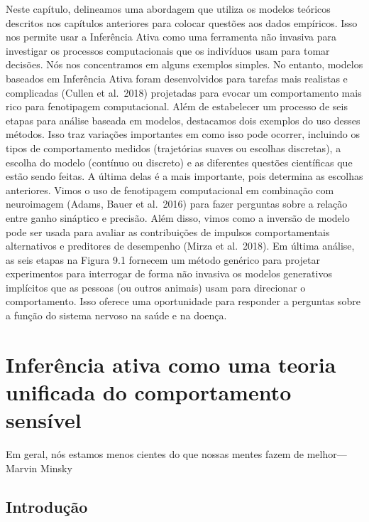 \documentclass[
  12pt,
]{book}
\begin{document}
Neste capítulo, delineamos uma abordagem que utiliza os modelos teóricos descritos nos capítulos anteriores para colocar questões aos dados empíricos. Isso nos permite usar a Inferência Ativa como uma ferramenta não invasiva para investigar os processos computacionais que os indivíduos usam para tomar decisões. Nós nos concentramos em alguns exemplos simples. No entanto, modelos baseados em Inferência Ativa foram desenvolvidos para tarefas mais realistas e complicadas (Cullen et al.~2018) projetadas para evocar um comportamento mais rico para fenotipagem computacional. Além de estabelecer um processo de seis etapas para análise baseada em modelos, destacamos dois exemplos do uso desses métodos. Isso traz variações importantes em como isso pode ocorrer, incluindo os tipos de comportamento medidos (trajetórias suaves ou escolhas discretas), a escolha do modelo (contínuo ou discreto) e as diferentes questões científicas que estão sendo feitas. A última delas é a mais importante, pois determina as escolhas anteriores. Vimos o uso de fenotipagem computacional em combinação com neuroimagem (Adams, Bauer et al.~2016) para fazer perguntas sobre a relação entre ganho sináptico e precisão. Além disso, vimos como a inversão de modelo pode ser usada para avaliar as contribuições de impulsos comportamentais alternativos e preditores de desempenho (Mirza et al.~2018). Em última análise, as seis etapas na Figura 9.1 fornecem um método genérico para projetar experimentos para interrogar de forma não invasiva os modelos generativos implícitos que as pessoas (ou outros animais) usam para direcionar o comportamento. Isso oferece uma oportunidade para responder a perguntas sobre a função do sistema nervoso na saúde e na doença.

\hypertarget{inferuxeancia-ativa-como-uma-teoria-unificada-do-comportamento-sensuxedvel}{%
\chapter{Inferência ativa como uma teoria unificada do comportamento sensível}\label{inferuxeancia-ativa-como-uma-teoria-unificada-do-comportamento-sensuxedvel}}

Em geral, nós estamos menos cientes do que nossas mentes fazem de melhor---Marvin Minsky

\hypertarget{introduuxe7uxe3o-9}{%
\section{Introdução}\label{introduuxe7uxe3o-9}}
\end{document}
